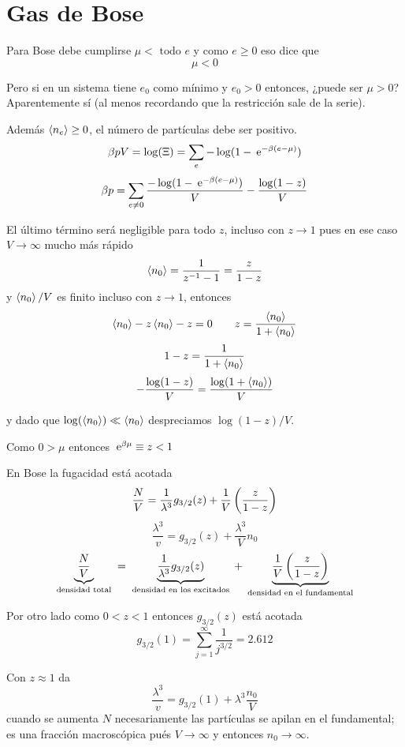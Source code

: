 \documentclass[10pt,oneside]{CBFT_book}
\begin{document}
\chapter{Gas de Bose}

Para Bose debe cumplirse $ \mu < \text{ todo } e $ 
y como $ e \geq 0$ eso dice que 
\[
	\mu < 0
\]

Pero si en un sistema tiene $ e_0 $ como mínimo y $ e_0 > 0 $ entonces, ¿puede ser $ \mu > 0 $?
Aparentemente sí (al menos recordando que la restricción sale de la serie).

Además $ \braket{n_e} \geq 0 $, el número de partículas debe ser positivo.
\[
	\beta p V = \log (\Xi) = \sum_e - \log ( 1 - \:\mathrm{e}^{-\beta(e-\mu)})
\]
\[
	\beta p = \sum_{e \neq 0} \frac{- \log ( 1 - \:\mathrm{e}^{-\beta(e-\mu)}) }{V} - \frac{\log (1-z)}{V}
\]

El último término será negligible para todo $z$, incluso con $z\to 1$ pues en ese caso $V \to \infty$ mucho
más rápido
\[
	\braket{n_0} = \frac{1}{z^{-1}-1} = \frac{z}{1-z}
\]
y $ \braket{n_0} / V $ es finito incluso con $z\to 1$, entonces
\[
	\braket{n_0} - z \braket{n_0} - z = 0 \qquad z = \frac{\braket{n_0}}{1+\braket{n_0}}
\]
\[
	1-z = \frac{1}{1+\braket{n_0}}
\]
\[
	- \frac{\log (1-z)}{V} = \frac{\log (1+\braket{n_0})}{V}
\]
 
y dado que $ \log (\braket{n_0}) \ll \braket{n_0} $ despreciamos $ \log (1-z) / V $.

Como $ 0 > \mu $ entonces $ \:\mathrm{e}^{\beta \mu} \equiv z < 1 $

En Bose la fugacidad está acotada
\[
	\frac{N}{V} = \frac{1}{\lambda^3} g_{3/2}(z) + \frac{1}{V}\left( \frac{ z }{ 1-z } \right)
\]
\[
	\frac{\lambda^3}{v} =  g_{3/2}(z) + \frac{\lambda^3}{V} n_0
\]
\[
	\underbrace{\frac{N}{V}}_{\text{ densidad total }} =
	\underbrace{\frac{1}{\lambda^3} g_{3/2}(z)}_{\text{ densidad en los excitados }} +
	\underbrace{\frac{1}{V}\left( \frac{ z }{ 1-z } \right)}_{\text{ densidad en el fundamental }}
\]

Por otro lado como $ 0 < z < 1 $ entonces $ g_{3/2}(z) $ está acotada 
\[
	g_{3/2}(1) = \sum_{j=1}^\infty \frac{1}{j^{3/2}} = 2.612
\]

Con $z\approx 1$ da
\[
	\frac{\lambda^3}{v} = g_{3/2}(1) + \lambda^3 \frac{n_0}{V} 
\]
cuando se aumenta $N$ necesariamente las partículas se apilan en el fundamental; es una
fracción macroscópica pués $ V \to \infty $ y entonces $ n_0 \to \infty $.
\end{document}

